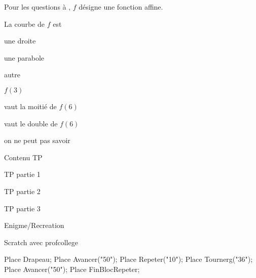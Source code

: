 \documentclass[nocrop]{sesamanuel}
\begin{document}

\begin{QCM}
  \begin{EnonceCommunQCM}
    Pour les questions  à
    , $f$ désigne une
    fonction affine.
    \end{EnonceCommunQCM}

\begin{GroupeQCM}
\begin{exercice}\label{premier-qcm2}
La courbe de $f$ est
\begin{ChoixQCM}{3}
\item une droite
\item une parabole
\item autre
\end{ChoixQCM}
\end{exercice}
\begin{corrige}
\end{corrige}
\begin{exercice}\label{deuxieme-qcm2}
$f(3)$
\begin{ChoixQCM}{3}
\item vaut la moitié de $f(6)$
\item vaut le double de $f(6)$
\item on ne peut pas savoir
\end{ChoixQCM}
\end{exercice}
\begin{corrige}
\end{corrige}
\end{GroupeQCM}
\end{QCM}

\TravauxPratiques
\begin{TP}
  Contenu TP
  
  TP partie 1
  
  
  TP partie 2
  
  
  TP partie 3 
\end{TP}

\recreation
  \begin{enigme}
    Enigme/Recreation

    Scratch avec profcollege

      \begin{Scratch}
        Place Drapeau;
        Place Avancer("50");
        Place Repeter("10");
        Place Tournerg("36");
        Place Avancer("50");
        Place FinBlocRepeter;
        \end{Scratch}

    \end{enigme}
\end{document}

